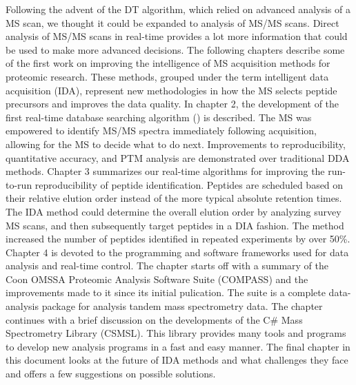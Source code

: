 Following the advent of the DT algorithm, which relied on advanced analysis of a MS scan, we thought it could be expanded to analysis of MS/MS scans. Direct analysis of MS/MS scans in real-time provides a lot more information that could be used to make more advanced decisions. The following chapters describe some of the first work on improving the intelligence of MS acquisition methods for proteomic research. These methods, grouped under the term intelligent data acquisition (IDA), represent new methodologies in how the MS selects peptide precursors and improves the data quality. In chapter 2, the development of the first real-time database searching algorithm (\inseq{}) is described. The MS was empowered to identify MS/MS spectra immediately following acquisition, allowing for the MS to decide what to do next. Improvements to reproducibility, quantitative accuracy, and PTM analysis are demonstrated over traditional DDA methods. Chapter 3 summarizes our real-time algorithms for improving the run-to-run reproducibility of peptide identification. Peptides are scheduled based on their relative elution order instead of the more typical absolute retention times. The IDA method could determine the overall elution order by analyzing survey MS scans, and then subsequently target peptides in a DIA fashion. The method increased the number of peptides identified in repeated experiments by over 50\%. Chapter 4 is devoted to the programming and software frameworks used for data analysis and real-time control. The chapter starts off with a summary of the Coon OMSSA Proteomic Analysis Software Suite (COMPASS) and the improvements made to it since its initial pulication.\cite{compass} The suite is a complete data-analysis package for analysis tandem mass spectrometry data. The chapter continues with a brief discussion on the developments of the C\# Mass Spectrometry Library (CSMSL). This library provides many tools and programs to develop new analysis programs in a fast and easy manner. The final chapter in this document looks at the future of IDA methods and what challenges they face and offers a few suggestions on possible solutions.


